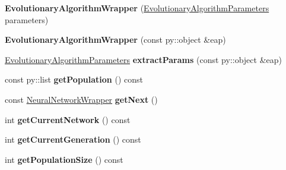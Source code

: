 \begin{DoxyCompactItemize}
\item 
{\bfseries Evolutionary\+Algorithm\+Wrapper} (\hyperlink{structEvolutionaryAlgorithmParameters}{Evolutionary\+Algorithm\+Parameters} parameters)\hypertarget{classEvolutionaryAlgorithmWrapper_a51c553095ac5ad1dff5378600d5c6ddf}{}\label{classEvolutionaryAlgorithmWrapper_a51c553095ac5ad1dff5378600d5c6ddf}

\item 
{\bfseries Evolutionary\+Algorithm\+Wrapper} (const py\+::object \&eap)\hypertarget{classEvolutionaryAlgorithmWrapper_af888e9cc96a9911a4764e8a47e93d1d0}{}\label{classEvolutionaryAlgorithmWrapper_af888e9cc96a9911a4764e8a47e93d1d0}

\item 
\hyperlink{structEvolutionaryAlgorithmParameters}{Evolutionary\+Algorithm\+Parameters} {\bfseries extract\+Params} (const py\+::object \&eap)\hypertarget{classEvolutionaryAlgorithmWrapper_ac1897e332aee1e923887b35c1188a876}{}\label{classEvolutionaryAlgorithmWrapper_ac1897e332aee1e923887b35c1188a876}

\item 
const py\+::list {\bfseries get\+Population} () const \hypertarget{classEvolutionaryAlgorithmWrapper_a77e675d5999e8ad3aa19caa565674cae}{}\label{classEvolutionaryAlgorithmWrapper_a77e675d5999e8ad3aa19caa565674cae}

\item 
const \hyperlink{classNeuralNetworkWrapper}{Neural\+Network\+Wrapper} {\bfseries get\+Next} ()\hypertarget{classEvolutionaryAlgorithmWrapper_a6614c0e436c0a131e17fa752b4a5169c}{}\label{classEvolutionaryAlgorithmWrapper_a6614c0e436c0a131e17fa752b4a5169c}

\item 
int {\bfseries get\+Current\+Network} () const \hypertarget{classEvolutionaryAlgorithmWrapper_a9537b305026a8abc332921ef450b2faa}{}\label{classEvolutionaryAlgorithmWrapper_a9537b305026a8abc332921ef450b2faa}

\item 
int {\bfseries get\+Current\+Generation} () const \hypertarget{classEvolutionaryAlgorithmWrapper_a26ecce8a95de7abbd594ca58789a934d}{}\label{classEvolutionaryAlgorithmWrapper_a26ecce8a95de7abbd594ca58789a934d}

\item 
int {\bfseries get\+Population\+Size} () const \hypertarget{classEvolutionaryAlgorithmWrapper_a5682579b3f47d4511695a8d5d2d66c2e}{}\label{classEvolutionaryAlgorithmWrapper_a5682579b3f47d4511695a8d5d2d66c2e}


\end{DoxyCompactItemize}
